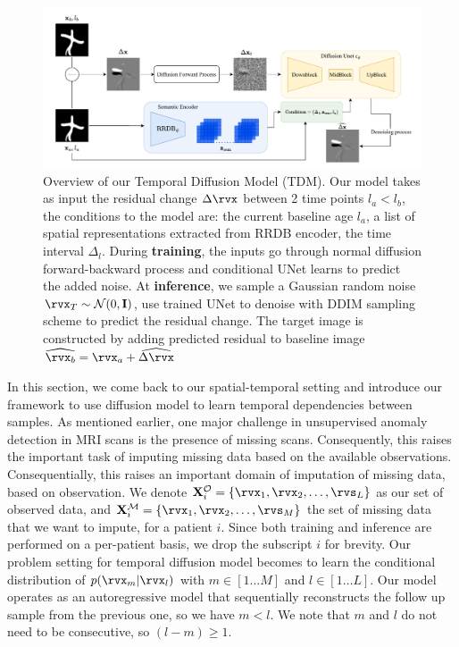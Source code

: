 \begin{figure}
    \centering
    \includegraphics[width=1\linewidth]{figures/model-tdm.pdf}
    \caption{Overview of our Temporal Diffusion Model (TDM). Our model takes as input the residual change $\Delta\rvx$ between 2 time points $l_a < l_b$, the conditions to the model are: the current baseline age $l_a$, a list of spatial representations extracted from RRDB \cite{zhang2018RRDB} encoder, the time interval $\Delta_l$. During \textbf{training}, the inputs go through normal diffusion forward-backward process and conditional UNet learns to predict the added noise. At \textbf{inference}, we sample a Gaussian random noise $\rvx_T \sim \mathcal{N}(0, \mathbf{I})$, use trained UNet to denoise with DDIM sampling scheme to predict the residual change. The target image is constructed by adding predicted residual to baseline image $\widehat{\rvx_b} = \rvx_a + \widehat{\Delta\rvx}$}
    \label{fig:model-tdm}
\end{figure}

In this section, we come back to our spatial-temporal setting and introduce our framework to use diffusion model to learn temporal dependencies between samples. As mentioned earlier, one major challenge in unsupervised anomaly detection in MRI scans is the presence of missing scans. Consequently, this raises the important task of imputing missing data based on the available observations. Consequentially, this raises an important domain of imputation of missing data, based on observation. We denote $\mathbf{X}^{\mathcal{O}}_{i} = \{\rvx_1, \rvx_2, \dots, \rvs_L\}$ as our set of observed data, and $\mathbf{X}^{\mathcal{M}}_{i} = \{\rvx_1, \rvx_2, \dots, \rvs_M\}$ the set of missing data that we want to impute, for a patient $i$. Since both training and inference are performed on a per-patient basis, we drop the subscript $i$ for brevity. Our problem setting for temporal diffusion model becomes to learn the conditional distribution of $p(\rvx_m | \rvx_l)$ with $m \in [1 \dots M]$ and $l \in [1 \dots L]$. Our model operates as an autoregressive model that sequentially reconstructs the follow up sample from the previous one, so we have $m < l$. We note that $m$ and $l$ do not need to be consecutive, so $(l - m) \geq 1$.

